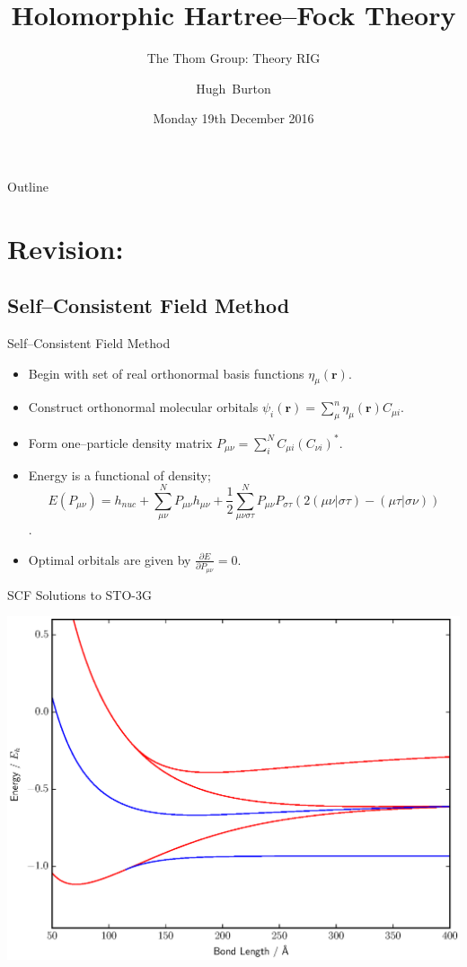 \documentclass{beamer}
\title[Holomorphic Hartree--Fock Theory]
{%
  Holomorphic Hartree--Fock Theory
}
\subtitle{The Thom Group: Theory RIG}
\author[Burton, Thom]
{
  \hskip-1.7mm
  Hugh~Burton %
}
\institute[Burton and others]
{
  University of Cambridge
}
\date[December 2016]{Monday 19th December 2016}
\newcommand{\dbd}[2] {{\frac{\partial #1}{\partial #2}}}
\begin{document}
\begin{frame}
  \titlepage
\end{frame}

\begin{frame}{Outline}
  \tableofcontents
\end{frame}

\section{Revision:}

\subsection{Self--Consistent Field Method}
\begin{frame}{Self--Consistent Field Method}
 \begin{itemize}
  \item Begin with set of real orthonormal basis functions $\eta_\mu (\mathbf{r})$.
  \item Construct orthonormal molecular orbitals $\psi_i(\mathbf{r}) = \sum_\mu^n \eta_\mu (\mathbf{r}) C_{\mu i}$.
  \item Form one--particle density matrix $P_{\mu\nu}=\sum_i^N C_{\mu i} (C_{\nu i})^{*}$.
  \item Energy is a functional of density;
  $$E(P_{\mu\nu}) = h_{nuc} + \sum_{\mu\nu}^N P_{\mu\nu} h_{\mu\nu} + \frac{1}{2} \sum_{\mu\nu\sigma\tau}^N P_{\mu\nu} P_{\sigma\tau} \left(2\left(\mu\nu|\sigma\tau\right) - \left(\mu\tau|\sigma\nu\right)\right)$$.
  \item Optimal orbitals are given by $\dbd{E}{P_{\mu\nu}}=0$.
 \end{itemize}
\end{frame} 

\begin{frame}{SCF Solutions to  STO-3G}
  \begin{center}
    \includegraphics[scale=0.4]{normal_UHF_HH_sto-3g}
  \end{center}
\end{frame}
\end{document}
